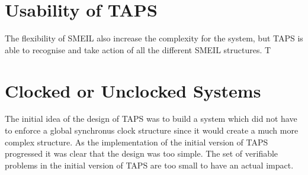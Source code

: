 
\section{Usability of TAPS}



The flexibility of SMEIL also increase the complexity for the system, but TAPS is able to recognise and take action of all the different SMEIL structures. T

\section{Clocked or Unclocked \cspm{} Systems}
The initial idea of the design of TAPS was to build a system which did not have to enforce a global synchronus clock structure since it would create a much more complex structure. As the implementation of the initial version of TAPS progressed it was clear that the design was too simple. The set of verifiable problems in the initial version of TAPS are too small to have an actual impact.\\


